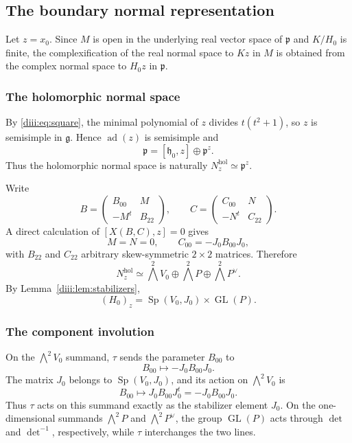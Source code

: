 \documentclass[10pt,a4paper]{amsart}
\numberwithin{equation}{section}
\newcommand{\GL}{\operatorname{GL}}
\newcommand{\Sp}{\operatorname{Sp}}
\newcommand{\fg}{\mathfrak g}
\newcommand{\fh}{\mathfrak h}
\newcommand{\fp}{\mathfrak p}
\newcommand{\wedgeTwo}{\bigwedge^{2}}
\begin{document}
\subsection{The boundary normal representation}

Let $z=x_0$.  Since $M$ is open in the underlying real vector space of $\fp$ and $K/H_0$ is finite, the complexification of the real normal space to $Kz$ in $M$ is obtained from the complex normal space to $H_0z$ in $\fp$.

\subsubsection{The holomorphic normal space}

By \eqref{diii:eq:square}, the minimal polynomial of $z$ divides
$t(t^2+1)$, so $z$ is semisimple in $\fg$.  Hence $\operatorname{ad}(z)$ is semisimple and
\begin{equation}\label{diii:eq:normal-centralizer}
  \fp=[\fh_0,z]\oplus\fp^z.
\end{equation}
Thus the holomorphic normal space is naturally
$N_z^{\mathrm{hol}}\simeq\fp^z$.

Write
\[
 B=\begin{pmatrix}B_{00}&M\\-M^t&B_{22}\end{pmatrix},
 \qquad
 C=\begin{pmatrix}C_{00}&N\\-N^t&C_{22}\end{pmatrix}.
\]
A direct calculation of $[X(B,C),z]=0$ gives
\[
  M=N=0,
  \qquad
  C_{00}=-J_0B_{00}J_0,
\]
with $B_{22}$ and $C_{22}$ arbitrary skew-symmetric $2\times2$ matrices.  Therefore
\begin{equation}\label{diii:eq:Nhol}
  N_z^{\mathrm{hol}}
  \simeq
  \wedgeTwo V_0\oplus\wedgeTwo P\oplus\wedgeTwo P^\vee.
\end{equation}
By Lemma~\ref{diii:lem:stabilizers},
\[
  (H_0)_z=\Sp(V_0,J_0)\times\GL(P).
\]

\subsubsection{The component involution}

On the $\wedgeTwo V_0$ summand, $\tau$ sends the parameter $B_{00}$ to
\begin{equation}\label{diii:eq:tauV0}
  B_{00}\longmapsto -J_0B_{00}J_0.
\end{equation}
The matrix $J_0$ belongs to $\Sp(V_0,J_0)$, and its action on
$\wedgeTwo V_0$ is
\[
  B_{00}\longmapsto J_0B_{00}J_0^t=-J_0B_{00}J_0.
\]
Thus $\tau$ acts on this summand exactly as the stabilizer element $J_0$.
On the one-dimensional summands $\wedgeTwo P$ and $\wedgeTwo P^\vee$, the group $\GL(P)$ acts through $\det$ and $\det^{-1}$, respectively, while $\tau$ interchanges the two lines.
\end{document}
